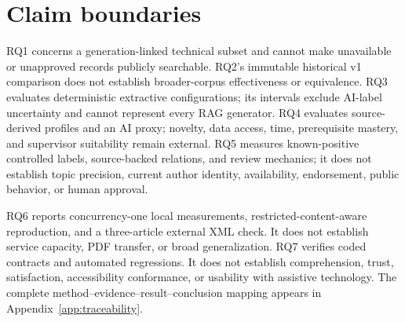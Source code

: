 \section{Claim boundaries}

RQ1 concerns a generation-linked technical subset and cannot make unavailable or unapproved records publicly searchable. RQ2's immutable historical v1 comparison does not establish broader-corpus effectiveness or equivalence. RQ3 evaluates deterministic extractive configurations; its intervals exclude AI-label uncertainty and cannot represent every RAG generator. RQ4 evaluates source-derived profiles and an AI proxy; novelty, data access, time, prerequisite mastery, and supervisor suitability remain external. RQ5 measures known-positive controlled labels, source-backed relations, and review mechanics; it does not establish topic precision, current author identity, availability, endorsement, public behavior, or human approval.

RQ6 reports concurrency-one local measurements, restricted-content-aware reproduction, and a three-article external XML check. It does not establish service capacity, PDF transfer, or broad generalization. RQ7 verifies coded contracts and automated regressions. It does not establish comprehension, trust, satisfaction, accessibility conformance, or usability with assistive technology. The complete method--evidence--result--conclusion mapping appears in Appendix~\ref{app:traceability}.
